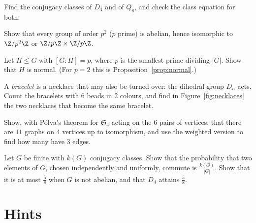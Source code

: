 \begin{exercise}[$\star$]\label{ex:classesD}
Find the conjugacy classes of $D_4$ and of $Q_8$, and check the class equation for both.
\end{exercise}

\begin{exercise}[$\star\star$]\label{ex:p2}
Show that every group of order $p^2$ ($p$ prime) is abelian, hence isomorphic to $\Z/p^2\Z$ or $\Z/p\Z\times\Z/p\Z$.
\end{exercise}

\begin{exercise}[$\star\star$]\label{ex:smallestprime}
Let $H\le G$ with $[G:H]=p$, where $p$ is the smallest prime dividing $|G|$. Show that $H$ is normal. (For $p=2$ this is Proposition~\ref{prop:normal}.)
\end{exercise}

\begin{exercise}[$\star\star$]\label{ex:bracelets}
A \emph{bracelet} is a necklace that may also be turned over: the dihedral group $D_n$ acts. Count the bracelets with $6$ beads in $2$ colours, and find in Figure~\ref{fig:necklaces} the two necklaces that become the same bracelet.
\end{exercise}

\begin{exercise}[$\star\star$]\label{ex:graphs4}
Show, with P\'olya's theorem for $\mathfrak S_4$ acting on the $6$ pairs of vertices, that there are $11$ graphs on $4$ vertices up to isomorphism, and use the weighted version to find how many have $3$ edges.
\end{exercise}

\begin{exercise}[$\star\star\star$]\label{ex:commuting}
Let $G$ be finite with $k(G)$ conjugacy classes. Show that the probability that two elements of $G$, chosen independently and uniformly, commute is $\frac{k(G)}{|G|}$. Show that it is at most $\frac58$ when $G$ is not abelian, and that $D_4$ attains $\frac58$.
\end{exercise}

\section{Hints}

